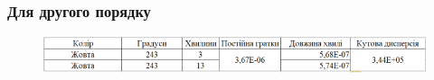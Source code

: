 \subsubsection{Для другого порядку}

\begin{figure}[ht]

\centering

\includegraphics[width=1\linewidth]{Pics/tabl4.png}

\label{table1}

\end{figure}

